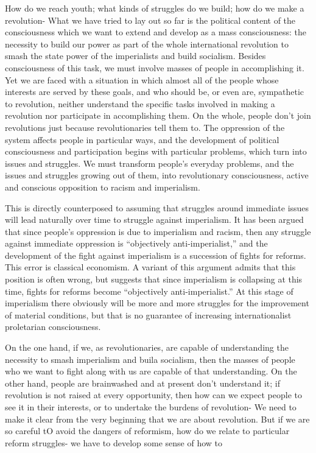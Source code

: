 \documentclass[12pt, titlepage]{article}
\begin{document}
{\begin{spacing}{1.10}
How do we reach youth; what kinds of struggles do we build; how do we make a revolution- What we have tried to lay out so far is the political content of the consciousness which we want to extend and develop as a mass consciousness: the necessity to build our power as part of the whole international revolution to smash the state power of the imperialists and build socialism. Besides consciousness of this task, we must involve masses of people in accomplishing it. Yet we are faced with a situation in which almost all of the people whose interests are served by these goals, and who should be, or even are, sympathetic to revolution, neither understand the specific tasks involved in making a revolution nor participate in accomplishing them. On the whole, people don't join revolutions just because revolutionaries tell them to. The oppression of the system affects people in particular ways, and the development of political consciousness and participation begins with particular problems, which turn into issues and struggles. We must transform people's everyday problems, and the issues and struggles growing out of them, into revolutionary consciousness, active and conscious opposition to racism and imperialism.

This is directly counterposed to assuming that struggles around immediate issues will lead naturally over time to struggle against imperialism. It has been argued that since people's oppression is due to imperialism and racism, then any struggle against immediate oppression is ``objectively anti-imperialist,'' and the development of the fight against imperialism is a succession of fights for reforms. This error is classical economism. A variant of this argument admits that this position is often wrong, but suggests that since imperialism is collapsing at this time, fights for reforms become ``objectively anti-imperialist.'' At this stage of imperialism there obviously will be more and more struggles for the improvement of material conditions, but that is no guarantee of increasing internationalist proletarian consciousness.

On the one hand, if we, as revolutionaries, are capable of understanding the necessity to smash imperialism and buila socialism, then the masses of people who we want to fight along with us are capable of that understanding. On the other hand, people are brainwashed and at present don't understand it; if revolution is not raised at every opportunity, then how can we expect people to see it in their interests, or to undertake the burdens of revolution- We need to make it clear from the very beginning that we are about revolution. But if we are so careful tO avoid the dangers of reformism, how do we relate to particular reform struggles- we have to develop some sense of how to 


\end{spacing}}
\end{document}
